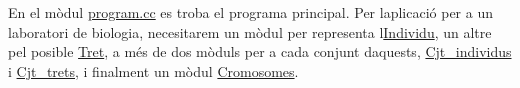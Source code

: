 En el mòdul \hyperlink{program_8cc}{program.\+cc} es troba el programa principal. Per l\textquotesingle{}aplicació per a un laboratori de biologia, necesitarem un mòdul per representa l\textquotesingle{}\hyperlink{class_individu}{Individu}, un altre pel posible \hyperlink{class_tret}{Tret}, a més de dos mòduls per a cada conjunt d\textquotesingle{}aquests, \hyperlink{class_cjt__individus}{Cjt\+\_\+individus} i \hyperlink{class_cjt__trets}{Cjt\+\_\+trets}, i finalment un mòdul \hyperlink{class_cromosomes}{Cromosomes}. 